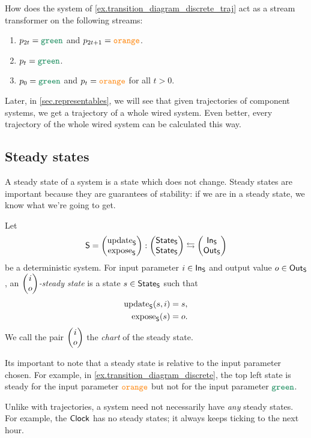 \documentclass[DynamicalBook]{subfiles}
\begin{document}
\begin{exercise}
 How does the system of \cref{ex.transition_diagram_discrete_traj} act as a
 stream transformer on the following streams:
 \begin{enumerate}
   \item $p_{2t} = \Green$ and $p_{2t + 1} = {\color{orange} \mathtt{orange}}$.
   \item $p_t = \Green$.
   \item $p_0 = \Green$ and $p_t = {\color{orange} \mathtt{orange}}$ for
     all $t > 0$.
 \end{enumerate}
\end{exercise}

Later, in \cref{sec.representables}, we will see that given trajectories of
component systems, we get a trajectory of a whole wired system. Even better,
every trajectory of the whole wired system can be calculated this way.


\subsection{Steady states}

A steady state of a system is a state which does not change. Steady states are
important because they are guarantees of stability: if we are in a steady state,
we know what we're going to get.

\begin{definition}\label{def.steady_state_discrete}
 Let $$\mathsf{S} = \begin{pmatrix}{\mathrm{update}_{\mathsf{S}}} \\ {\mathrm{expose}_{\mathsf{S}}} \end{pmatrix} : \begin{pmatrix}{\mathsf{State}_{\mathsf{S}}} \\ {\mathsf{State}_{\mathsf{S}}} \end{pmatrix}
 \leftrightarrows \begin{pmatrix}{\mathsf{In}_{\mathsf{S}}} \\ {\mathsf{Out}_{\mathsf{S}}} \end{pmatrix}$$
 be a deterministic system. For input parameter $i \in \mathsf{In}_{\mathsf{S}}$ and output value
 $o \in \mathsf{Out}_{\mathsf{S}}$, an \emph{$\begin{pmatrix}{i} \\ {o} \end{pmatrix}$-steady state} is a state $s \in \mathsf{State}_{\mathsf{S}}$
 such that
 \begin{align*}
   \mathrm{update}_{\mathsf{S}}(s, i) &= s, \\
   \mathrm{expose}_{\mathsf{S}}(s) &= o.
 \end{align*}
 We call the pair $\begin{pmatrix}{i} \\ {o} \end{pmatrix}$ the \emph{chart} of the steady state.
\end{definition}

\begin{remark}
Its important to note that a steady state is relative to the input parameter
chosen. For example, in \cref{ex.transition_diagram_discrete}, the top left
state is steady for the input parameter ${\color{orange} \mathtt{orange}}$ but not for
the input parameter $\Green$.
\end{remark}

Unlike with trajectories, a system need not necessarily have \emph{any} steady
states. For example, the $\mathsf{Clock}$ has no steady states; it always keeps
ticking to the next hour. 
\end{document}

